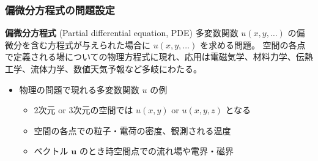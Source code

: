 \documentclass[dvipdfmx,aspectratio=169,20pt]{beamer}
\newcommand{\myfontsetting}[3]{{\fontsize{#1}{#2}\selectfont #3}}
\begin{document}
\date[\todey]{}

\frame{\titlepage}

\begin{frame}
\frametitle{\myfontsetting{24pt}{24pt}{偏微分方程式の問題設定}}
\begin{block}{{\bf\small 偏微分方程式} {\small (Partial differential equation, PDE)}}
\myfontsetting{14pt}{16pt}{多変数関数 $u(x,y,\dots)$ の偏微分を含む方程式が与えられた場合に $u(x,y,\dots)$ を求める問題。
空間の各点で定義される場についての物理方程式に現れ、応用は電磁気学、材料力学、伝熱工学、流体力学、数値天気予報など多岐にわたる。
}
\end{block}

\vspace{-2mm}

\begin{itemize}
    \item \myfontsetting{14pt}{16pt}{物理の問題で現れる多変数関数 $u$ の例}
    \begin{itemize}
\vspace{-1mm}
        \item \myfontsetting{12pt}{12pt}{2次元 or 3次元の空間では $u(x,y)$ or $u(x,y,z)$ となる}
\vspace{-1mm}
        \item \myfontsetting{12pt}{12pt}{空間の各点での粒子・電荷の密度、観測される温度}
\vspace{-1mm}
        \item \myfontsetting{12pt}{12pt}{ベクトル $\bm{u}$ のとき時空間点での流れ場や電界・磁界}
    \end{itemize}
\end{itemize}
\end{frame}
\end{document}

